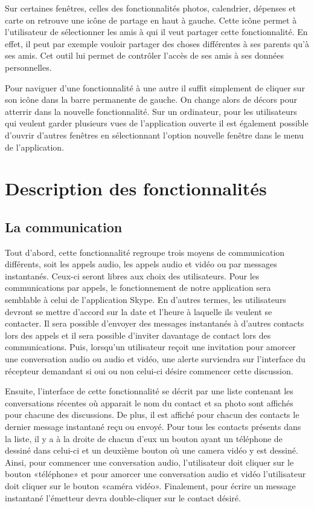 \documentclass[11pt]{article}
\begin{document}
Sur certaines fenêtres, celles des fonctionnalités photos, calendrier, dépenses et carte on retrouve une icône de partage en haut à gauche. Cette icône permet à l'utilisateur de sélectionner les amis à qui il veut partager cette fonctionnalité. En effet, il peut par exemple vouloir partager des choses différentes à ses parents qu'à ses amis. Cet outil lui permet de contrôler l'accès de ses amis à ses données personnelles. 

Pour naviguer d'une fonctionnalité à une autre il suffit simplement de cliquer sur son icône dans la barre permanente de gauche. On change alors de décors pour atterrir dans la nouvelle fonctionnalité. Sur un ordinateur, pour les utilisateurs qui veulent garder plusieurs vues de l'application ouverte il est également possible d'ouvrir d'autres fenêtres en sélectionnant l'option nouvelle fenêtre dans le menu de l'application.

\section{Description des fonctionnalités}
\subsection{La communication}\label{par:com}
	Tout d’abord, cette fonctionnalité regroupe trois moyens de communication différents, soit les appels  audio, les appels audio et vidéo ou par messages instantanés. Ceux-ci seront libres aux choix des utilisateurs. Pour les communications par appels, le fonctionnement de notre application sera semblable à celui de l’application Skype. En d’autres termes, les utilisateurs devront se mettre d’accord sur la date et l’heure à laquelle ils veulent se contacter. Il sera possible d’envoyer des messages instantanés à d’autres contacts lors des appels  et il sera possible d’inviter davantage de contact lors des communications. Puis, lorsqu’un utilisateur reçoit une invitation pour amorcer une conversation audio ou audio et vidéo, une alerte surviendra sur l’interface du récepteur demandant si oui ou non celui-ci désire commencer cette discussion. 
	
	Ensuite, l’interface de cette fonctionnalité se décrit par une liste contenant les conversations récentes où apparait le nom du contact et sa photo sont affichés pour chacune des discussions. De plus, il est affiché pour chacun des contacts le dernier message instantané reçu ou envoyé. Pour tous les contacts présents dans la liste, il y a à la droite de chacun d’eux un bouton ayant un téléphone de dessiné dans celui-ci et un deuxième bouton où une camera vidéo y est dessiné. Ainsi, pour commencer une conversation audio, l’utilisateur doit cliquer sur le bouton «téléphone» et pour amorcer une conversation audio et vidéo l’utilisateur doit cliquer sur le bouton «caméra vidéo». Finalement, pour écrire un message instantané l’émetteur devra double-cliquer sur le contact désiré.
\end{document}
